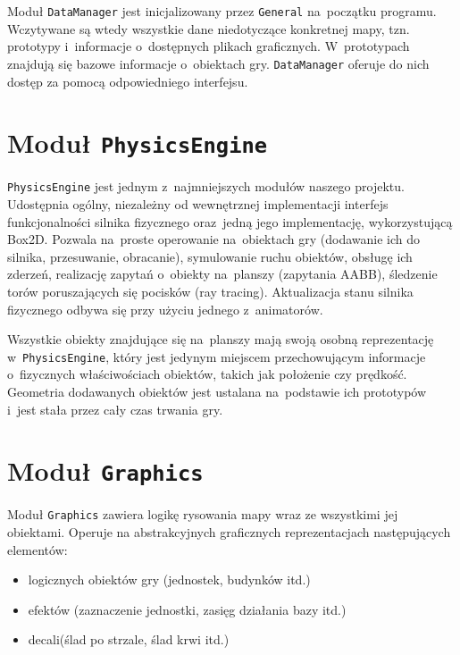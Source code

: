 \documentclass[licencjacka]{pracamgr}
\begin{document}
    Moduł \texttt{DataManager} jest inicjalizowany przez \texttt{General} na~początku programu. Wczytywane są wtedy wszystkie dane
    niedotyczące konkretnej mapy, tzn. prototypy i~informacje o~dostępnych plikach graficznych. W~prototypach znajdują się 
    bazowe informacje o~obiektach gry. \texttt{DataManager} oferuje do nich dostęp za pomocą odpowiedniego interfejsu.

  \section{Moduł \texttt{PhysicsEngine}}
    \texttt{PhysicsEngine} jest jednym z~najmniejszych modułów naszego projektu. Udostępnia ogólny, niezależny od
    wewnętrznej implementacji interfejs funkcjonalności silnika fizycznego oraz~jedną jego implementację, wykorzystującą Box2D.
    Pozwala na~proste operowanie na~obiektach gry (dodawanie ich do silnika, przesuwanie, obracanie), symulowanie ruchu obiektów,
    obsługę ich zderzeń, realizację zapytań o~obiekty na~planszy (zapytania AABB), śledzenie torów poruszających się pocisków (ray tracing).
    Aktualizacja stanu silnika fizycznego odbywa się przy użyciu jednego z~animatorów.

    Wszystkie obiekty znajdujące się na~planszy mają swoją osobną reprezentację w~\texttt{PhysicsEngine}, który jest jedynym miejscem
    przechowującym informacje o~fizycznych właściwościach obiektów, takich jak położenie czy prędkość. Geometria dodawanych obiektów
    jest ustalana na~podstawie ich prototypów i~jest stała przez cały czas trwania gry.

  \section{Moduł \texttt{Graphics}}
    Moduł \texttt{Graphics} zawiera logikę rysowania mapy wraz ze wszystkimi jej obiektami. Operuje na
    abstrakcyjnych graficznych reprezentacjach następujących elementów:
    \begin{itemize}
     \item logicznych obiektów gry (jednostek, budynków itd.)
     \item efektów (zaznaczenie jednostki, zasięg działania bazy itd.)
     \item decali\protect\footnotemark (ślad po strzale, ślad krwi itd.)
    \end{itemize}
\end{document}
